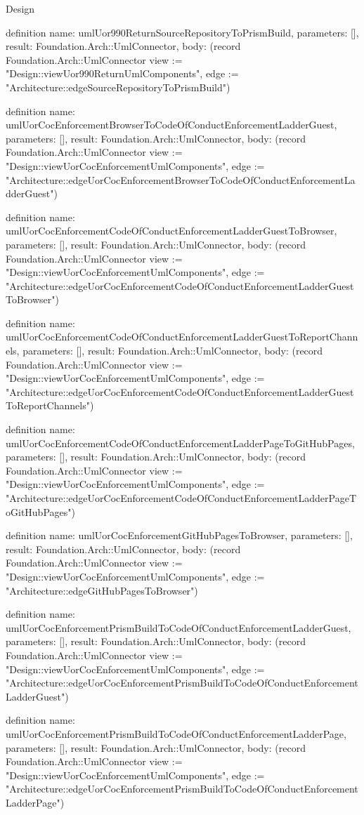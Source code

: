\begin{lexlean}{Design}
\begin{semanticmodule}
definition{
  name: umlUor990ReturnSourceRepositoryToPrismBuild,
  parameters: [],
  result: Foundation.Arch::UmlConnector,
  body: (record Foundation.Arch::UmlConnector {view := "Design::viewUor990ReturnUmlComponents", edge := "Architecture::edgeSourceRepositoryToPrismBuild"})
}

definition{
  name: umlUorCocEnforcementBrowserToCodeOfConductEnforcementLadderGuest,
  parameters: [],
  result: Foundation.Arch::UmlConnector,
  body: (record Foundation.Arch::UmlConnector {view := "Design::viewUorCocEnforcementUmlComponents", edge := "Architecture::edgeUorCocEnforcementBrowserToCodeOfConductEnforcementLadderGuest"})
}

definition{
  name: umlUorCocEnforcementCodeOfConductEnforcementLadderGuestToBrowser,
  parameters: [],
  result: Foundation.Arch::UmlConnector,
  body: (record Foundation.Arch::UmlConnector {view := "Design::viewUorCocEnforcementUmlComponents", edge := "Architecture::edgeUorCocEnforcementCodeOfConductEnforcementLadderGuestToBrowser"})
}

definition{
  name: umlUorCocEnforcementCodeOfConductEnforcementLadderGuestToReportChannels,
  parameters: [],
  result: Foundation.Arch::UmlConnector,
  body: (record Foundation.Arch::UmlConnector {view := "Design::viewUorCocEnforcementUmlComponents", edge := "Architecture::edgeUorCocEnforcementCodeOfConductEnforcementLadderGuestToReportChannels"})
}

definition{
  name: umlUorCocEnforcementCodeOfConductEnforcementLadderPageToGitHubPages,
  parameters: [],
  result: Foundation.Arch::UmlConnector,
  body: (record Foundation.Arch::UmlConnector {view := "Design::viewUorCocEnforcementUmlComponents", edge := "Architecture::edgeUorCocEnforcementCodeOfConductEnforcementLadderPageToGitHubPages"})
}

definition{
  name: umlUorCocEnforcementGitHubPagesToBrowser,
  parameters: [],
  result: Foundation.Arch::UmlConnector,
  body: (record Foundation.Arch::UmlConnector {view := "Design::viewUorCocEnforcementUmlComponents", edge := "Architecture::edgeGitHubPagesToBrowser"})
}

definition{
  name: umlUorCocEnforcementPrismBuildToCodeOfConductEnforcementLadderGuest,
  parameters: [],
  result: Foundation.Arch::UmlConnector,
  body: (record Foundation.Arch::UmlConnector {view := "Design::viewUorCocEnforcementUmlComponents", edge := "Architecture::edgeUorCocEnforcementPrismBuildToCodeOfConductEnforcementLadderGuest"})
}

definition{
  name: umlUorCocEnforcementPrismBuildToCodeOfConductEnforcementLadderPage,
  parameters: [],
  result: Foundation.Arch::UmlConnector,
  body: (record Foundation.Arch::UmlConnector {view := "Design::viewUorCocEnforcementUmlComponents", edge := "Architecture::edgeUorCocEnforcementPrismBuildToCodeOfConductEnforcementLadderPage"})
}


\end{semanticmodule}
\end{lexlean}
